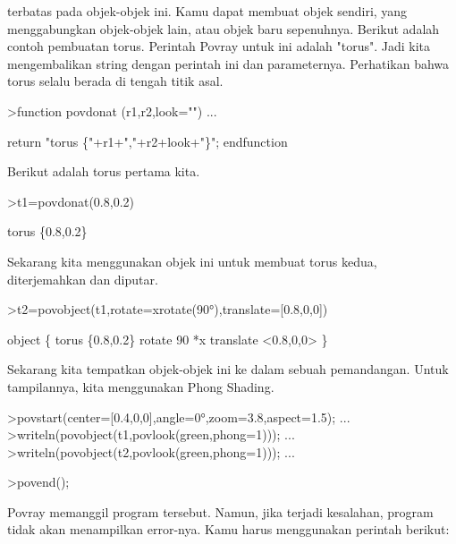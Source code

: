 \documentclass[a4paper,10pt]{article}
\begin{document}
\begin{eulernotebook}
\begin{eulercomment}
\begin{eulercomment}
\begin{eulercomment}
terbatas pada objek-objek ini. Kamu dapat membuat objek sendiri, yang
menggabungkan objek-objek lain, atau objek baru sepenuhnya. Berikut
adalah contoh pembuatan torus. Perintah Povray untuk ini adalah
"torus". Jadi kita mengembalikan string dengan perintah ini dan
parameternya. Perhatikan bahwa torus selalu berada di tengah titik
asal.
\end{eulercomment}
\begin{eulerprompt}
>function povdonat (r1,r2,look="") ...
\end{eulerprompt}
\begin{eulerudf}
    return "torus \{"+r1+","+r2+look+"\}";
  endfunction
\end{eulerudf}
\begin{eulercomment}
Berikut adalah torus pertama kita.
\end{eulercomment}
\begin{eulerprompt}
>t1=povdonat(0.8,0.2)
\end{eulerprompt}
\begin{euleroutput}
  torus \{0.8,0.2\}
\end{euleroutput}
\begin{eulercomment}
Sekarang kita menggunakan objek ini untuk membuat torus kedua,
diterjemahkan dan diputar.
\end{eulercomment}
\begin{eulerprompt}
>t2=povobject(t1,rotate=xrotate(90°),translate=[0.8,0,0])
\end{eulerprompt}
\begin{euleroutput}
  object \{ torus \{0.8,0.2\}
   rotate 90 *x 
   translate <0.8,0,0>
   \}
\end{euleroutput}
\begin{eulercomment}
Sekarang kita tempatkan objek-objek ini ke dalam sebuah pemandangan.
Untuk tampilannya, kita menggunakan Phong Shading.
\end{eulercomment}
\begin{eulerprompt}
>povstart(center=[0.4,0,0],angle=0°,zoom=3.8,aspect=1.5); ...
>writeln(povobject(t1,povlook(green,phong=1))); ...
>writeln(povobject(t2,povlook(green,phong=1))); ...
\end{eulerprompt}
\begin{eulerttcomment}
 >povend();
\end{eulerttcomment}
\begin{eulercomment}
Povray memanggil program tersebut. Namun, jika terjadi kesalahan,
program tidak akan menampilkan error-nya. Kamu harus menggunakan
perintah berikut:


\end{eulercomment}
\end{eulercomment}
\end{eulercomment}
\end{eulernotebook}
\end{document}
